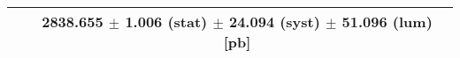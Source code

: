\begin{tabular}{lc}
\hline
                               & 2838.655 $\pm$ 1.006 (stat) $\pm$ 24.094 (syst) $\pm$ 51.096 (lum) [pb]  \\
\hline
\end{tabular}
